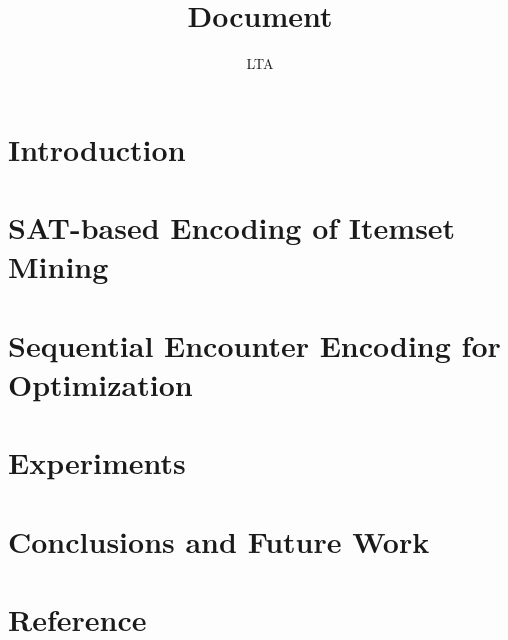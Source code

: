 \documentclass[14pt,a4paper]{report}
\title{Document}
\author{LTA}
\begin{document}










\fontsize{13}{15}\selectfont

\chapter{Introduction}





\chapter{SAT-based Encoding of Itemset Mining}




\chapter{Sequential Encounter Encoding for Optimization}



\chapter{Experiments}



\chapter*{Conclusions and Future Work}



\chapter*{Reference}
\nocite{*}
\printbibliography
\end{document}
